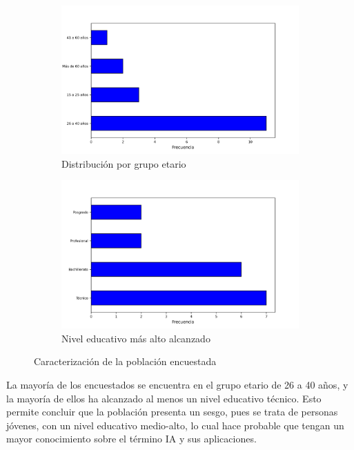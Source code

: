 \documentclass[12pt,a4paper]{article}
\begin{document}
\begin{figure}[h!]
    \centering
    \begin{subfigure}{0.45\linewidth}
        \centering
        \includegraphics[width=\linewidth]{1_En que grupo etario se encuentra.jpg}
        \caption{Distribución por grupo etario}
        \label{fig:f1}
    \end{subfigure}
    \hfill
    \begin{subfigure}{0.45\linewidth}
        \centering
        \includegraphics[width=\linewidth]{2_Cuál es el nivel educativo más alto que ha alcanzado.jpg}
        \caption{Nivel educativo más alto alcanzado}
        \label{fig:f2}
    \end{subfigure}
    \caption{Caracterización de la población encuestada}
\end{figure}

La mayoría de los encuestados se encuentra en el grupo etario de 26 a 40 años, y la mayoría de ellos 
ha alcanzado al menos un nivel educativo técnico. Esto permite concluir que la población presenta un sesgo, pues 
se trata de personas jóvenes, con un nivel educativo medio-alto, lo cual hace probable que tengan un 
mayor conocimiento sobre el término IA y sus aplicaciones.
\end{document}

